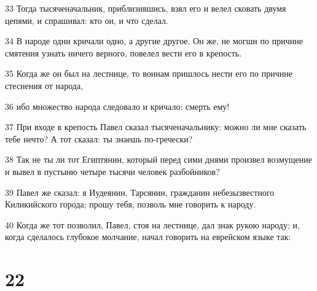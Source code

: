 \par 33 Тогда тысяченачальник, приблизившись, взял его и велел сковать двумя цепями, и спрашивал: кто он, и что сделал.
\par 34 В народе одни кричали одно, а другие другое. Он же, не могши по причине смятения узнать ничего верного, повелел вести его в крепость.
\par 35 Когда же он был на лестнице, то воинам пришлось нести его по причине стеснения от народа,
\par 36 ибо множество народа следовало и кричало: смерть ему!
\par 37 При входе в крепость Павел сказал тысяченачальнику: можно ли мне сказать тебе нечто? А тот сказал: ты знаешь по-гречески?
\par 38 Так не ты ли тот Египтянин, который перед сими днями произвел возмущение и вывел в пустыню четыре тысячи человек разбойников?
\par 39 Павел же сказал: я Иудеянин, Тарсянин, гражданин небезызвестного Киликийского города; прошу тебя, позволь мне говорить к народу.
\par 40 Когда же тот позволил, Павел, стоя на лестнице, дал знак рукою народу; и, когда сделалось глубокое молчание, начал говорить на еврейском языке так:

\chapter{22}

